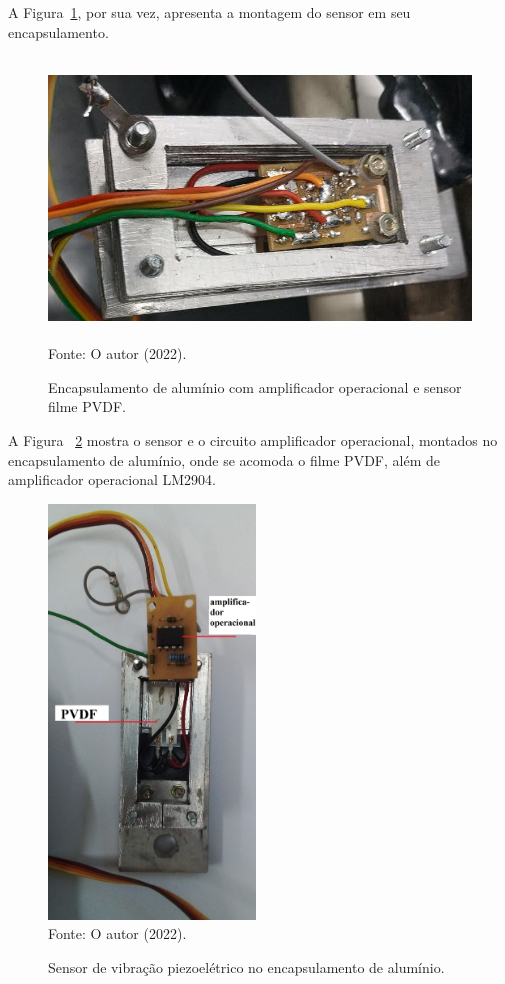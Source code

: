\documentclass[
	12pt,				
	oneside,			
	a4paper,			
	english,			
	brazil,			
	]{abntex2ppgsi}
\begin{document}
A Figura~\ref{encapsulamento_sensor}, por sua vez, apresenta a montagem do sensor em seu encapsulamento.

\begin{figure}[H]
\centering
\caption {Encapsulamento de alumínio com amplificador operacional e sensor filme PVDF.}
\includegraphics[width=\textwidth,height=75mm,keepaspectratio]{encapsulamento_sensor} \\
Fonte: O autor (2022).
\label{encapsulamento_sensor}
\end{figure} 

A Figura ~\ref{sensor_e_operacional} mostra o sensor e o circuito amplificador operacional, montados no encapsulamento de alumínio, onde se acomoda o filme PVDF, além de amplificador operacional LM2904.
 
\begin{figure}[H]
\centering
\caption {Sensor de vibração piezoelétrico no encapsulamento de alumínio.}
\includegraphics[width=\textwidth,height=110mm,keepaspectratio]{sensor_e_operacional} \\
Fonte: O autor (2022).
\label{sensor_e_operacional}
\end{figure} 
\end{document}
